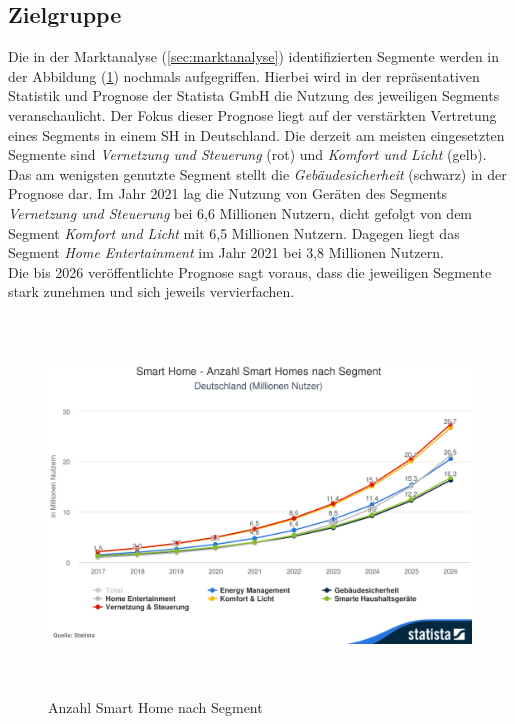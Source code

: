     \subsection{Zielgruppe} %
        Die in der Marktanalyse (\ref{sec:marktanalyse}) identifizierten Segmente werden in der Abbildung 
        (\ref{pic:segments}) nochmals aufgegriffen. Hierbei wird in der repräsentativen Statistik und Prognose der 
        Statista GmbH die Nutzung des jeweiligen Segments veranschaulicht. Der Fokus dieser Prognose liegt 
        auf der verstärkten Vertretung eines Segments in einem \acl{SH} in Deutschland. Die derzeit am meisten eingesetzten 
        Segmente sind \textit{Vernetzung und Steuerung} (rot) und \textit{Komfort und Licht} 
        (gelb). Das am wenigsten genutzte Segment stellt die \textit{Gebäudesicherheit} 
        (schwarz) in der Prognose dar. Im Jahr 2021 lag die Nutzung von Geräten des Segments \textit{Vernetzung und Steuerung} 
        bei 6,6 Millionen Nutzern, dicht gefolgt von dem Segment \textit{Komfort und Licht} mit 
        6,5 Millionen Nutzern. Dagegen liegt das Segment \textit{Home Entertainment} im Jahr 2021 bei 3,8 Millionen Nutzern.
        \\
        \linebreak
        Die bis 2026 veröffentlichte Prognose sagt voraus, dass die jeweiligen Segmente stark zunehmen %
        und sich jeweils vervierfachen.  
        \begin{figure}[hbt!]
            \centering
            \includegraphics[width=15cm,height=10cm,keepaspectratio]{images/Statista-Outlook-Smart-Home---Anzahl-Smart-Homes-nach-Segment-Deutschland-Millionen-Nutzer.png}
            \caption{Anzahl Smart Home nach Segment \cite{statista2021}} 
            \label{pic:segments}
        \end{figure}
